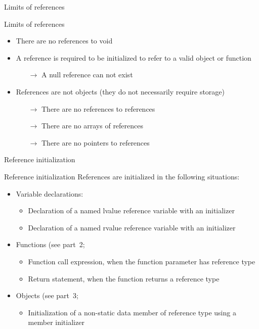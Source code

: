 \begin{frame}{Limits of references}{}
  \begin{block}{Limits of references}
    \begin{itemize}
    \item
      There are no references to void
    \item
      A reference is required to be initialized to refer to a valid object or function
      \begin{itemize}
      \item[$\to$]
        A null reference can not exist
      \end{itemize}
    \item
      References are not objects (they do not necessarily require storage)
      \begin{itemize}
      \item[$\to$]
        There are no references to references
      \item[$\to$]
        There are no arrays of references
      \item[$\to$]
        There are no pointers to references
      \end{itemize}
    \end{itemize}
  \end{block}
\end{frame}

\begin{frame}{Reference initialization}{}
  \begin{block}{Reference initialization}
    References are initialized in the following situations:
    \begin{itemize}
    \item
      Variable declarations:
      \begin{itemize}
      \item
        Declaration of a named lvalue reference variable with an initializer
      \item
        Declaration of a named rvalue reference variable with an initializer
      \end{itemize}
    \item
      Functions (see part~2; %
      \begin{itemize}
      \item
        Function call expression, when the function parameter has reference type
      \item
        Return statement, when the function returns a reference type
      \end{itemize}
    \item
      Objects (see part~3; %
      \begin{itemize}
      \item
         Initialization of a non-static data member of reference type using a member initializer
      \end{itemize}
    \end{itemize}
  \end{block}
\end{frame}



